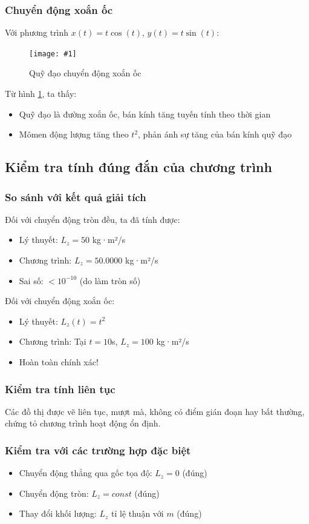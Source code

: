 \documentclass{report}
\newcommand{\insertimage}[3]{%
    \begin{figure}[!htbp]
        \centering
        \texttt{[image: \#1]}
        \caption{#3}
        \label{fig:#1}
    \end{figure}
}
\begin{document}
\subsubsection{Chuyển động xoắn ốc}
Với phương trình $x(t) = t\cos(t)$, $y(t) = t\sin(t)$:

\insertimage{pictures/vi_du_2_quy_dao_xoan_oc}{0.6}{Quỹ đạo chuyển động xoắn ốc}

Từ hình \ref{fig:pictures/vi_du_2_quy_dao_xoan_oc}, ta thấy:
\begin{itemize}
    \item Quỹ đạo là đường xoắn ốc, bán kính tăng tuyến tính theo thời gian
    \item Mômen động lượng tăng theo $t^2$, phản ánh sự tăng của bán kính quỹ đạo
\end{itemize}

\subsection{Kiểm tra tính đúng đắn của chương trình}

\subsubsection{So sánh với kết quả giải tích}
Đối với chuyển động tròn đều, ta đã tính được:
\begin{itemize}
    \item Lý thuyết: $L_z = 50$ kg·m²/s
    \item Chương trình: $L_z = 50.0000$ kg·m²/s
    \item Sai số: $< 10^{-10}$ (do làm tròn số)
\end{itemize}

Đối với chuyển động xoắn ốc:
\begin{itemize}
    \item Lý thuyết: $L_z(t) = t^2$
    \item Chương trình: Tại $t=10$s, $L_z = 100$ kg·m²/s
    \item Hoàn toàn chính xác!
\end{itemize}

\subsubsection{Kiểm tra tính liên tục}
Các đồ thị được vẽ liên tục, mượt mà, không có điểm gián đoạn hay bất thường, chứng tỏ chương trình hoạt động ổn định.

\subsubsection{Kiểm tra với các trường hợp đặc biệt}
\begin{itemize}
    \item Chuyển động thẳng qua gốc tọa độ: $L_z = 0$ (đúng)
    \item Chuyển động tròn: $L_z = const$ (đúng)
    \item Thay đổi khối lượng: $L_z$ tỉ lệ thuận với $m$ (đúng)
\end{itemize}
\end{document}
